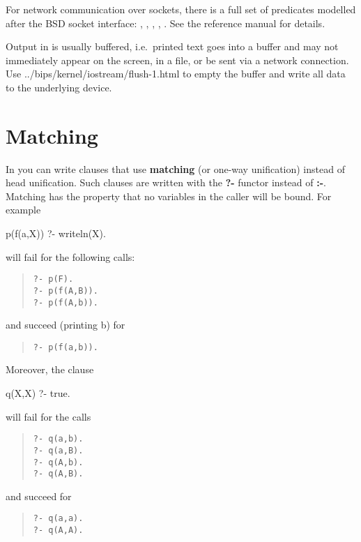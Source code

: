 For network communication over sockets, there is a full set of predicates
modelled after the BSD socket interface:
,
,
,
,
.
See the reference manual for details.

Output in \eclipse{} is usually buffered, i.e.\ printed text goes into
a buffer and may not immediately appear on the screen, in a file, or
be sent via a network connection. Use
{../bips/kernel/iostream/flush-1.html}
to empty the buffer and write all data to the underlying device.




\section{Matching}
In \eclipse{} you can write clauses that use {\bf matching} (or one-way
unification) instead of head unification. 
Such clauses are written with the {\bf ?-} functor instead of {\bf :-}.
Matching has the property that no variables in the caller will be bound.
For example
\begin{code}
p(f(a,X)) ?- writeln(X).
\end{code}
will fail for the following calls:
\begin{quote}\begin{verbatim}
?- p(F).
?- p(f(A,B)).
?- p(f(A,b)).
\end{verbatim}\end{quote}
and succeed (printing b) for
\begin{quote}\begin{verbatim}
?- p(f(a,b)).
\end{verbatim}\end{quote}
Moreover, the clause
\begin{code}
q(X,X) ?- true.
\end{code}
will fail for the calls
\begin{quote}\begin{verbatim}
?- q(a,b).
?- q(a,B).
?- q(A,b).
?- q(A,B).
\end{verbatim}\end{quote}
and succeed for
\begin{quote}\begin{verbatim}
?- q(a,a).
?- q(A,A).
\end{verbatim}\end{quote}



